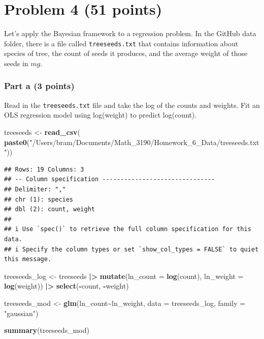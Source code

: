 \documentclass[
]{article}
\newenvironment{Shaded}{\begin{snugshade}}{\end{snugshade}}
\newcommand{\AttributeTok}[1]{\textcolor[rgb]{0.13,0.29,0.53}{#1}}
\newcommand{\FunctionTok}[1]{\textcolor[rgb]{0.13,0.29,0.53}{\textbf{#1}}}
\newcommand{\NormalTok}[1]{#1}
\newcommand{\OtherTok}[1]{\textcolor[rgb]{0.56,0.35,0.01}{#1}}
\newcommand{\SpecialCharTok}[1]{\textcolor[rgb]{0.81,0.36,0.00}{\textbf{#1}}}
\newcommand{\StringTok}[1]{\textcolor[rgb]{0.31,0.60,0.02}{#1}}
\begin{document}
\hypertarget{problem-4-51-points}{%
\section{Problem 4 (51 points)}\label{problem-4-51-points}}

Let's apply the Bayesian framework to a regression problem. In the
GitHub data folder, there is a file called \texttt{treeseeds.txt} that
contains information about species of tree, the count of seeds it
produces, and the average weight of those seeds in \(mg\).

\hypertarget{part-a-3-points}{%
\subsubsection{Part a (3 points)}\label{part-a-3-points}}

Read in the \texttt{treeseeds.txt} file and take the log of the counts
and weights. Fit an OLS regression model using log(weight) to predict
log(count).

\begin{Shaded}
\begin{Highlighting}[]
\NormalTok{treeseeds }\OtherTok{\textless{}{-}} \FunctionTok{read\_csv}\NormalTok{(}
  \FunctionTok{paste0}\NormalTok{(}\StringTok{"/Users/bram/Documents/Math\_3190/Homework\_6\_Data/treeseeds.txt"}\NormalTok{))}
\end{Highlighting}
\end{Shaded}

\begin{verbatim}
## Rows: 19 Columns: 3
## -- Column specification -------------------------------
## Delimiter: ","
## chr (1): species
## dbl (2): count, weight
## 
## i Use `spec()` to retrieve the full column specification for this data.
## i Specify the column types or set `show_col_types = FALSE` to quiet this message.
\end{verbatim}

\begin{Shaded}
\begin{Highlighting}[]
\NormalTok{treeseeds\_log }\OtherTok{\textless{}{-}}\NormalTok{ treeseeds }\SpecialCharTok{|\textgreater{}} 
  \FunctionTok{mutate}\NormalTok{(}\AttributeTok{ln\_count =} \FunctionTok{log}\NormalTok{(count), }\AttributeTok{ln\_weight =} \FunctionTok{log}\NormalTok{(weight)) }\SpecialCharTok{|\textgreater{}} 
  \FunctionTok{select}\NormalTok{(}\SpecialCharTok{{-}}\NormalTok{count, }\SpecialCharTok{{-}}\NormalTok{weight)}

\NormalTok{treeseeds\_mod }\OtherTok{\textless{}{-}} \FunctionTok{glm}\NormalTok{(ln\_count}\SpecialCharTok{\textasciitilde{}}\NormalTok{ln\_weight, }\AttributeTok{data =}\NormalTok{ treeseeds\_log, }\AttributeTok{family =} \StringTok{"gaussian"}\NormalTok{)}

\FunctionTok{summary}\NormalTok{(treeseeds\_mod)}
\end{Highlighting}
\end{Shaded}
\end{document}
